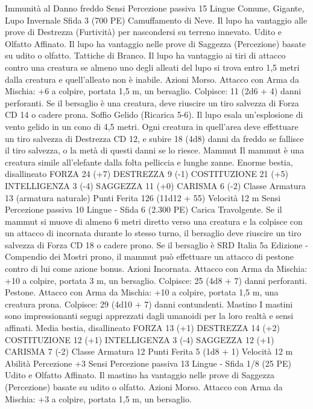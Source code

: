 \begin{multicols}{2}
Immunità al Danno freddo
Sensi Percezione passiva 15
Lingue Comune, Gigante, Lupo Invernale
Sfida 3 (700 PE)
Camuffamento di Neve. Il lupo ha vantaggio alle prove di
Destrezza (Furtività) per nascondersi su terreno innevato.
Udito e Olfatto Affinato. Il lupo ha vantaggio nelle prove di
Saggezza (Percezione) basate su udito o olfatto.
Tattiche di Branco. Il lupo ha vantaggio ai tiri di attacco contro
una creatura se almeno uno degli alleati del lupo si trova entro
1,5 metri dalla creatura e quell’alleato non è inabile.
Azioni
Morso. Attacco con Arma da Mischia: +6 a colpire, portata 1,5
m, un bersaglio.
Colpisce: 11 (2d6 + 4) danni perforanti. Se il bersaglio è una
creatura, deve riuscire un tiro salvezza di Forza CD 14 o cadere
prona.
Soffio Gelido (Ricarica 5-6). Il lupo esala un’esplosione di vento
gelido in un cono di 4,5 metri. Ogni creatura in quell’area deve
effettuare un tiro salvezza di Destrezza CD 12, e subire 18 (4d8)
danni da freddo se fallisce il tiro salvezza, o la metà di questi
danni se lo riesce.
Mammut
Il mammut è una creatura simile all’elefante dalla folta
pelliccia e lunghe zanne.
Enorme bestia, disallineato
FORZA 24 (+7)
DESTREZZA 9 (-1)
COSTITUZIONE 21 (+5)
INTELLIGENZA 3 (-4)
SAGGEZZA 11 (+0)
CARISMA 6 (-2)
Classe Armatura 13 (armatura naturale)
Punti Ferita 126 (11d12 + 55)
Velocità 12 m
Sensi Percezione passiva 10
Lingue -
Sfida 6 (2.300 PE)
Carica Travolgente. Se il mammut si muove di almeno 6 metri
diretto verso una creatura e la colpisce con un attacco di
incornata durante lo stesso turno, il bersaglio deve riuscire un
tiro salvezza di Forza CD 18 o cadere prono. Se il bersaglio è 
SRD Italia 5a Edizione - Compendio dei Mostri
prono, il mammut può effettuare un attacco di pestone contro di
lui come azione bonus.
Azioni
Incornata. Attacco con Arma da Mischia: +10 a colpire, portata
3 m, un bersaglio.
Colpisce: 25 (4d8 + 7) danni perforanti.
Pestone. Attacco con Arma da Mischia: +10 a colpire, portata
1,5 m, una creatura prona.
Colpisce: 29 (4d10 + 7) danni contundenti.
Mastino
I mastini sono impressionanti segugi apprezzati dagli
umanoidi per la loro realtà e sensi affinati.
Media bestia, disallineato
FORZA 13 (+1)
DESTREZZA 14 (+2)
COSTITUZIONE 12 (+1)
INTELLIGENZA 3 (-4)
SAGGEZZA 12 (+1)
CARISMA 7 (-2)
Classe Armatura 12
Punti Ferita 5 (1d8 + 1)
Velocità 12 m
Abilità Percezione +3
Sensi Percezione passiva 13
Lingue -
Sfida 1/8 (25 PE)
Udito e Olfatto Affinato. Il mastino ha vantaggio nelle prove di
Saggezza (Percezione) basate su udito o olfatto.
Azioni
Morso. Attacco con Arma da Mischia: +3 a colpire, portata 1,5
m, un bersaglio.

\end{multicols}
